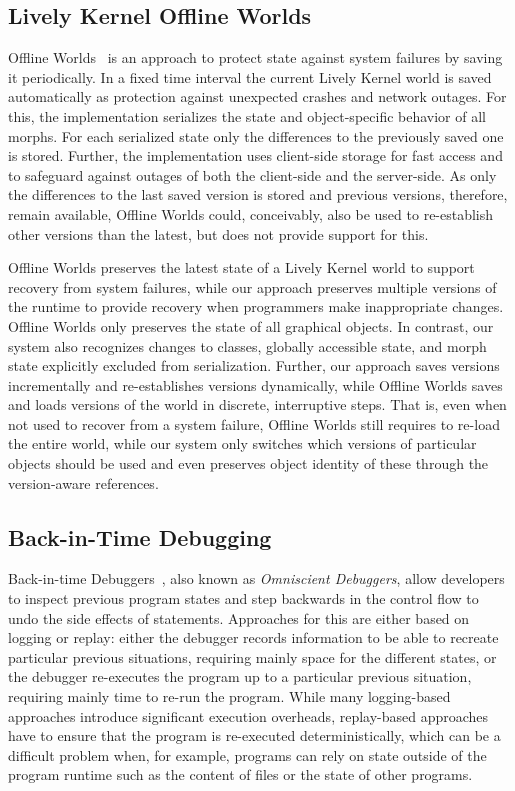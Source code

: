\subsection{Lively Kernel Offline Worlds}

Offline Worlds~\cite{Czuchra2012OfW} is an approach to protect state against system failures by saving it periodically.
In a fixed time interval the current Lively Kernel world is saved automatically as protection against unexpected crashes and network outages.
For this, the implementation serializes the state and object-specific behavior of all morphs.
For each serialized state only the differences to the previously saved one is stored.
Further, the implementation uses client-side storage for fast access and to safeguard against outages of both the client-side and the server-side.
As only the differences to the last saved version is stored and previous versions, therefore, remain available, Offline Worlds could, conceivably, also be used to re-establish other versions than the latest, but does not provide support for this.

Offline Worlds preserves the latest state of a Lively Kernel world to support recovery from system failures, while our approach preserves multiple versions of the runtime to provide recovery when programmers make inappropriate changes.
Offline Worlds only preserves the state of all graphical objects.
In contrast, our system also recognizes changes to classes, globally accessible state, and morph state explicitly excluded from serialization.
Further, our approach saves versions incrementally and re-establishes versions dynamically, while Offline Worlds saves and loads versions of the world in discrete, interruptive steps.
That is, even when not used to recover from a system failure, Offline Worlds still requires to re-load the entire world, while our system only switches which versions of particular objects should be used and even preserves object identity of these through the version-aware references.


\subsection{Back-in-Time Debugging}

Back-in-time Debuggers~\cite{Lewis2003BIT}, also known as \emph{Omniscient Debuggers}, allow developers to inspect previous program states and step backwards in the control flow to undo the side effects of statements.
Approaches for this are either based on logging or replay: either the debugger records information to be able to recreate particular previous situations, requiring mainly space for the different states, or the debugger re-executes the program up to a particular previous situation, requiring mainly time to re-run the program.
While many logging-based approaches introduce significant execution overheads, replay-based approaches have to ensure that the program is re-executed deterministically, which can be a difficult problem when, for example, programs can rely on state outside of the program runtime such as the content of files or the state of other programs.

